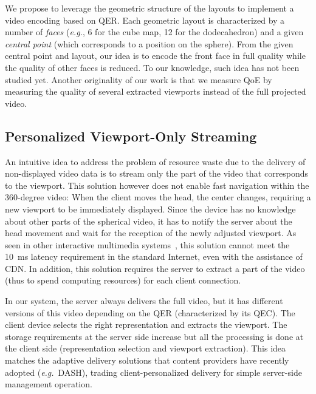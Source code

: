 We propose to leverage the geometric
structure of the layouts to implement a video encoding based on
\ac{QER}. Each geometric layout is characterized by a number of
\emph{faces} (\textit{e.g.}, 6 for the cube map, 12 for the
dodecahedron) and a given \emph{central point} (which corresponds to a
position on the sphere).
From the given central point and layout, our idea is to encode
the front face in full quality while the quality of other faces is
reduced.
To our knowledge, such idea has not been studied yet.
Another originality of our work is that we measure \ac{QoE} by
measuring the quality of several extracted viewports instead of
the full projected video.

\subsection{Personalized Viewport-Only Streaming}

An intuitive idea to address the problem of resource waste due to the
delivery of non-displayed video data is to stream only the part of the video that
corresponds to the viewport. This solution however does not enable
fast navigation within the $360$-degree video: When the client moves the
head, the \FoV{} center changes, requiring a new viewport to be
immediately displayed. Since the device has no knowledge about other
parts of the spherical video, it has to notify the server about the
head movement and wait for the reception of the newly adjusted viewport.
As seen in other interactive multimedia
systems~\cite{ChoyWSR14}, this solution cannot meet the \SI{10}{ms} latency
requirement in the standard Internet, even with the assistance of
\ac{CDN}. In addition, this solution requires the server to extract a
part of the video (thus to spend computing resources) for each client
connection.

In our system, the server always delivers
the full video, but it has different versions of this video depending
on the \ac{QER} (characterized by its \ac{QEC}). The client device
selects the right representation and extracts the viewport. The
storage requirements at the server side increase but all the
processing is done at the client side (representation selection and
viewport extraction). This idea matches the adaptive delivery
solutions that content providers have recently adopted (\textit{e.g.}~\ac{DASH}),
trading client-personalized delivery for
simple server-side management operation.

